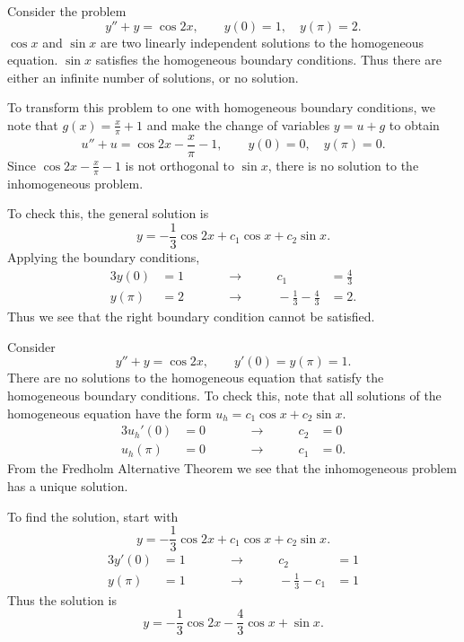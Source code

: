 \begin{Example}
  Consider the problem
  \[ y'' + y = \cos 2x, \qquad y(0) = 1, \quad y(\pi) = 2.\]
  $\cos x$ and $\sin x$ are two linearly independent solutions to the homogeneous 
  equation.  $\sin x$ satisfies the homogeneous boundary conditions.  Thus 
  there are either an infinite number of solutions, or no solution.

  To transform this problem to one with homogeneous boundary conditions, we
  note that $g(x) = \frac{x}{\pi} + 1$ and make the change of variables
  $y = u + g$ to obtain
  \[
  u'' + u = \cos 2x - \frac{x}{\pi} - 1, \qquad y(0) = 0, \quad y(\pi) = 0.
  \]
  Since $\cos 2x - \frac{x}{\pi} - 1$ is not orthogonal to $\sin x$, there is no 
  solution to the inhomogeneous problem.  

  To check this, the general solution is 
  \[ y = -\frac{1}{3} \cos 2x + c_1 \cos x + c_2 \sin x. \]
  Applying the boundary conditions,
  \begin{alignat*}{3}
    y(0) &= 1 &\qquad &\to &\qquad c_1 &= \frac{4}{3} \\
    y(\pi) &= 2 &\qquad &\to &\qquad -\frac{1}{3} - \frac{4}{3} &= 2.
  \end{alignat*}
  Thus we see that the right boundary condition cannot be satisfied.
\end{Example}







\begin{Example}
  Consider
  \[ y'' + y = \cos 2x, \qquad y'(0) = y(\pi) = 1. \]
  There are no solutions to the homogeneous equation that satisfy the homogeneous
  boundary conditions.  To check this, note that all solutions of the homogeneous
  equation have the form $u_h = c_1 \cos x + c_2 \sin x$.
  \begin{alignat*}{3}
    u_h'(0) &= 0 &\qquad &\to &\qquad c_2 &= 0 \\
    u_h(\pi) &= 0 &\qquad &\to &\qquad c_1 &= 0.
  \end{alignat*}
  From the Fredholm Alternative Theorem we see that the inhomogeneous problem
  has a unique solution.

  To find the solution, start with 
  \[ y = -\frac{1}{3} \cos 2x + c_1 \cos x + c_2 \sin x. \]
  \begin{alignat*}{3}
    y'(0) &= 1 &\qquad &\to &\qquad c_2 &= 1 \\
    y(\pi) &= 1 &\qquad &\to &\qquad -\frac{1}{3} - c_1 &= 1
  \end{alignat*}
  Thus the solution is
  \[ \boxed{ y = -\frac{1}{3} \cos 2x - \frac{4}{3} \cos x + \sin x. } \]
\end{Example}









